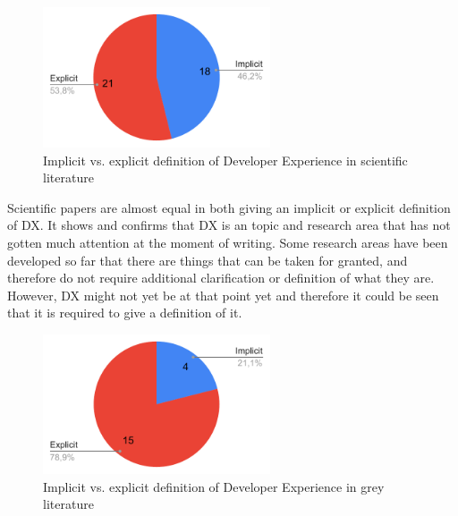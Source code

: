 \documentclass[english, 12pt, a4paper, sci, utf8, a-1b, online]{aaltothesis}
\begin{document}
\begin{figure}[ht]
  \begin{center}
    \includegraphics[width=0.6\textwidth]{definition-scientific.pdf}
  \end{center}
  \captionsetup{width=0.6\textwidth}
  \caption{Implicit vs. explicit definition of Developer Experience in scientific literature}
\end{figure}

Scientific papers are almost equal in both giving an implicit or explicit definition of DX. It shows and confirms that DX is an topic and research area that has not gotten much attention at the moment of writing. Some research areas have been developed so far that there are things that can be taken for granted, and therefore do not require additional clarification or definition of what they are. However, DX might not yet be at that point yet and therefore it could be seen that it is required to give a definition of it.

\begin{figure}[ht]
  \begin{center}
    \includegraphics[width=0.6\textwidth]{definition-grey.pdf}
    \captionsetup{width=0.6\textwidth}
    \caption{Implicit vs. explicit definition of Developer Experience in grey literature}
  \end{center}
\end{figure}
\end{document}
